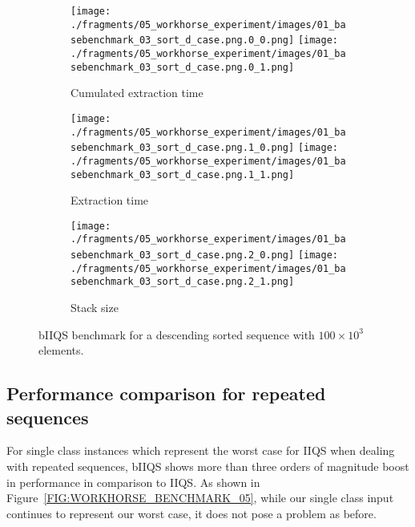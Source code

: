 \begin{figure}

    \centering
    \begin{subfigure}[b]{\textwidth}
        \centering
        \texttt{[image: ./fragments/05\_workhorse\_experiment/images/01\_basebenchmark\_03\_sort\_d\_case.png.0\_0.png]}
        \texttt{[image: ./fragments/05\_workhorse\_experiment/images/01\_basebenchmark\_03\_sort\_d\_case.png.0\_1.png]}
        \caption{Cumulated extraction time}
        \label{FIG:WORKHORSE_BENCHMARK_03__0_0}
    \end{subfigure}

    \begin{subfigure}[b]{\textwidth}
        \centering
        \texttt{[image: ./fragments/05\_workhorse\_experiment/images/01\_basebenchmark\_03\_sort\_d\_case.png.1\_0.png]}
        \texttt{[image: ./fragments/05\_workhorse\_experiment/images/01\_basebenchmark\_03\_sort\_d\_case.png.1\_1.png]}
        \caption{Extraction time}
        \label{FIG:WORKHORSE_BENCHMARK_03__0_1}
    \end{subfigure}

    \begin{subfigure}[b]{\textwidth}
        \centering
        \texttt{[image: ./fragments/05\_workhorse\_experiment/images/01\_basebenchmark\_03\_sort\_d\_case.png.2\_0.png]}
        \texttt{[image: ./fragments/05\_workhorse\_experiment/images/01\_basebenchmark\_03\_sort\_d\_case.png.2\_1.png]}
        \caption{Stack size}
        \label{FIG:WORKHORSE_BENCHMARK_03__0_2}
    \end{subfigure}
    
    \caption{bIIQS benchmark for a descending sorted sequence with $100\times10^3$ elements.}
       \label{FIG:WORKHORSE_BENCHMARK_03}
\end{figure}


\subsection{Performance comparison for repeated sequences}

For single class instances which represent the worst case for IIQS when dealing with repeated sequences, bIIQS shows more than three orders of magnitude boost in performance in comparison to IIQS. As shown in Figure~\ref{FIG:WORKHORSE_BENCHMARK_05}, while our single class input continues to represent our worst case, it does not pose a problem as before. \\

